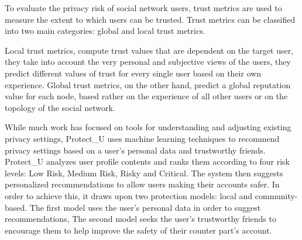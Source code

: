 

To evaluate the privacy risk of social network users,
	trust metrics are used to measure the extent to which users can be trusted.
Trust metrics can be classified into two main categories:
	global and local trust metrics.

Local trust metrics,
	compute trust values that are dependent on the target user,
	they take into account the very personal and subjective views of the users,
	they predict different values of trust for every single user based on their own experience.
Global trust metrics,
	on the other hand,
	predict a global reputation value for each node,
	based rather on the experience of all other users or on the topology of the social network.


While much work has focused on tools for understanding and adjusting existing privacy settings,
	Protect\_U \cite{gandouz_protect_2012} uses machine learning techniques to recommend privacy settings based on a user’s personal data and trustworthy friends.
Protect\_U analyzes user profile contents and ranks them according to four risk levels: Low Risk, Medium Risk, Risky and Critical.
The system then suggests personalized recommendations to allow users making their accounts safer.
In order to achieve this,
	it draws upon two protection models: local and community-based.
The first model uses the user’s personal data in order to suggest recommendations,
The second model seeks the user’s trustworthy friends to encourage them to help improve the safety of their counter part’s account.

